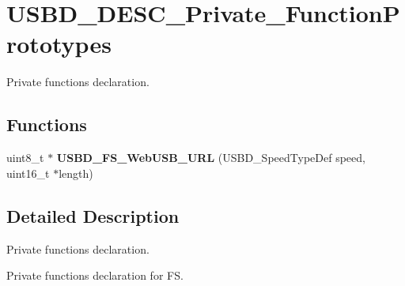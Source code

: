 \hypertarget{group__USBD__DESC__Private__FunctionPrototypes}{}\section{U\+S\+B\+D\+\_\+\+D\+E\+S\+C\+\_\+\+Private\+\_\+\+Function\+Prototypes}
\label{group__USBD__DESC__Private__FunctionPrototypes}


Private functions declaration.  


\subsection*{Functions}
\begin{DoxyCompactItemize}
\item 
\mbox{\label{group__USBD__DESC__Private__FunctionPrototypes_gad334d4b5b50ba752155c58632363409d}} 
uint8\+\_\+t $\ast$ {\bfseries U\+S\+B\+D\+\_\+\+F\+S\+\_\+\+Web\+U\+S\+B\+\_\+\+U\+RL} (U\+S\+B\+D\+\_\+\+Speed\+Type\+Def speed, uint16\+\_\+t $\ast$length)
\end{DoxyCompactItemize}


\subsection{Detailed Description}
Private functions declaration. 

Private functions declaration for FS.